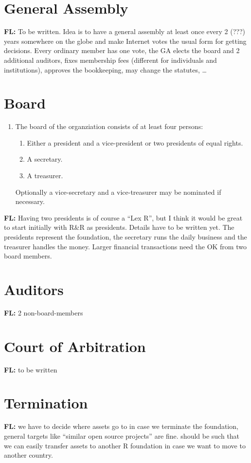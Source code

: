 \documentclass[a4paper]{article}
\newcommand{\note}[2]{{\it \par\noindent\textbf{#1:} #2}}
\begin{document}
\section{General Assembly}

\note{FL}{To be written. Idea is to have a general assembly at least
  once every 2 (???) years somewhere on the globe and make Internet
  votes the usual form for getting decisions.  Every ordinary member
  has one vote, the GA elects the board and 2 additional auditors,
  fixes membership fees (different for individuals and institutions),
  approves the bookkeeping, may change the statutes, \ldots}

\section{Board}

\begin{enumerate}
 \item The board of the organziation consists of at least four
  persons:
  \begin{enumerate}
   \item Either a president and a vice-president or two presidents of
    equal rights.
   \item A secretary.
   \item A treasurer.
  \end{enumerate}
  Optionally a vice-secretary and a vice-treasurer may be nominated if
  necessary.
\end{enumerate}

\note{FL}{Having two presidents is of course a ``Lex R'', but I think it
  would be great to start initially with R\&R as presidents. Details
  have to be written yet. The presidents represent the foundation, the
  secretary runs the daily business and the treasurer handles the
  money. Larger financial transactions need the OK from two board members.}

\section{Auditors}

\note{FL}{2 non-board-members}

\section{Court of Arbitration}

\note{FL}{to be written}

\section{Termination}

\note{FL}{we have to decide where assets go to in case we terminate the
  foundation, general targets like ``similar open source projects''
  are fine. should be such that we can easily transfer assets to another
  R foundation in case we want to move to another country.}
\end{document}

